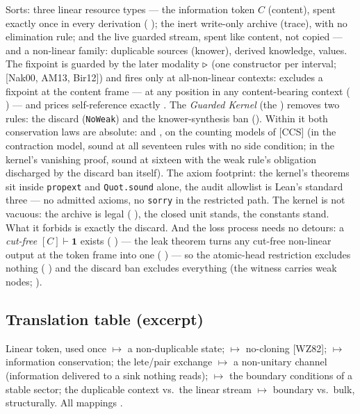 \documentclass[11pt]{article}
\begin{document}
Sorts: three linear resource types --- the information token $C$ (content),
spent exactly once in every derivation ( \meas{}); the
inert write-only archive (trace), with no elimination rule; and the live
guarded stream, spent like content, not copied --- and a non-linear family:
duplicable sources (knower), derived knowledge, values. The
fixpoint is guarded by the later modality $\triangleright{}$ (one constructor per
interval; [Nak00, AM13, Bir12]) and fires only at all-non-linear contexts:
 excludes a fixpoint at the content frame \meas{} ---
at any position in any content-bearing context
( \meas{}) --- and  prices
self-reference exactly
\meas{}. The \emph{Guarded Kernel} (the ) removes two rules:
the discard (\texttt{NoWeak}) and the knower-synthesis ban
(). Within it both conservation laws are absolute:
 and 
\meas{}, on the counting models of [CCS] (in the contraction model, sound at
all seventeen rules with no side condition; in the kernel's vanishing proof,
sound at sixteen with the weak rule's obligation discharged by the discard
ban itself). The axiom footprint: the kernel's theorems sit inside
\texttt{propext} and \texttt{Quot.sound} alone, the audit allowlist is
Lean's standard three --- no admitted axioms, no \texttt{sorry} in the
restricted path. The kernel is
not vacuous: the archive is legal ( \meas{}), the
closed unit stands, the constants stand. What it forbids is exactly the
discard. And the loss process needs no detours: a \emph{cut-free}
$[C] \vdash \mathbf{1}$ exists (
\meas{}) --- the leak theorem turns any cut-free non-linear output at the
token frame into one ( \meas{}) --- so
the atomic-head restriction excludes nothing (
\meas{}) and the discard ban excludes
everything (the witness carries weak nodes;
 \meas{}).

\subsection{Translation table (excerpt)}

Linear token, used once $\mapsto$ a non-duplicable state;
 $\mapsto$ no-cloning [WZ82];
 $\mapsto$ information conservation; the
lete/pair exchange $\mapsto$ a non-unitary channel (information delivered to
a sink nothing reads);  $\mapsto$ the boundary conditions of
a stable sector; the duplicable context vs.\ the linear stream $\mapsto$
boundary vs.\ bulk, structurally. All mappings \interp{}.
\end{document}
